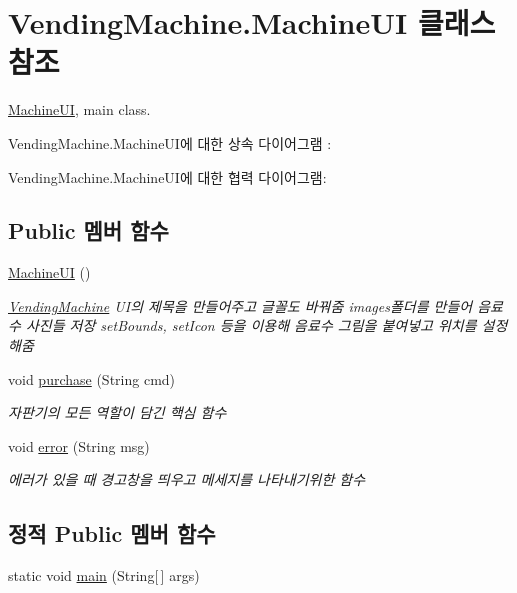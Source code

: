 \hypertarget{class_vending_machine_1_1_machine_u_i}{}\section{Vending\+Machine.\+Machine\+UI 클래스 참조}
\label{class_vending_machine_1_1_machine_u_i}


\hyperlink{class_vending_machine_1_1_machine_u_i}{Machine\+UI}, main class.  




Vending\+Machine.\+Machine\+U\+I에 대한 상속 다이어그램 \+: 


Vending\+Machine.\+Machine\+U\+I에 대한 협력 다이어그램\+:
\subsection*{Public 멤버 함수}
\begin{DoxyCompactItemize}
\item 
\hyperlink{class_vending_machine_1_1_machine_u_i_a3c614e330b9975abf0909d61b694f8d9}{Machine\+UI} ()
\begin{DoxyCompactList}\small\item\em \hyperlink{namespace_vending_machine}{Vending\+Machine} U\+I의 제목을 만들어주고 글꼴도 바꿔줌 images폴더를 만들어 음료수 사진들 저장 set\+Bounds, set\+Icon 등을 이용해 음료수 그림을 붙여넣고 위치를 설정해줌 \end{DoxyCompactList}\item 
void \hyperlink{class_vending_machine_1_1_machine_u_i_aadccf593dc69281c9ebbfe1fbe09b804}{purchase} (String cmd)
\begin{DoxyCompactList}\small\item\em 자판기의 모든 역할이 담긴 핵심 함수 \end{DoxyCompactList}\item 
void \hyperlink{class_vending_machine_1_1_machine_u_i_a737e9b912652fdd8ed7824f12992d1bf}{error} (String msg)
\begin{DoxyCompactList}\small\item\em 에러가 있을 때 경고창을 띄우고 메세지를 나타내기위한 함수 \end{DoxyCompactList}\end{DoxyCompactItemize}
\subsection*{정적 Public 멤버 함수}
\begin{DoxyCompactItemize}
\item 
static void \hyperlink{class_vending_machine_1_1_machine_u_i_a67854fcd3cbbd79f6c2076fc25f73f42}{main} (String\mbox{[}$\,$\mbox{]} args)
\end{DoxyCompactItemize}
